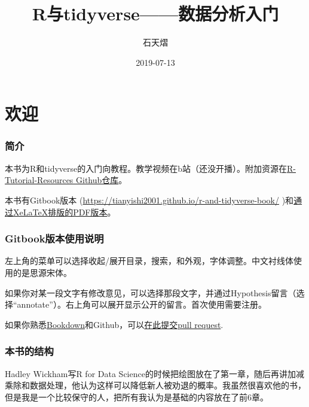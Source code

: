 \documentclass[]{book}
\title{R与tidyverse------数据分析入门}
\author{石天熠}
\date{2019-07-13}
\begin{document}
\maketitle

{
\setcounter{tocdepth}{1}
\tableofcontents
}
\hypertarget{welcome}{%
\chapter*{欢迎}\label{welcome}}

\hypertarget{intro}{%
\subsection*{简介}\label{intro}}

本书为R和tidyverse的入门向教程。教学视频在b站（还没开播）。附加资源在\href{https://github.com/TianyiShi2001/R-Tutorial-Resorces}{R-Tutorial-Resources Github仓库}。

本书有Gitbook版本 (\url{https://tianyishi2001.github.io/r-and-tidyverse-book/} )和\href{https://tianyishi2001.github.io/r-and-tidyverse-book/R与tidyverse——数据分析入门.pdf}{通过XeLaTeX排版的PDF版本}。

\hypertarget{man}{%
\subsection*{Gitbook版本使用说明}\label{man}}

左上角的菜单可以选择收起/展开目录，搜索，和外观，字体调整。中文衬线体使用的是思源宋体。

如果你对某一段文字有修改意见，可以选择那段文字，并通过Hypothesis留言（选择``annotate''）。右上角可以展开显示公开的留言。首次使用需要注册。

如果你熟悉\href{https://bookdown.org}{Bookdown}和Github，可以\href{https://github.com/TianyiShi2001/r-and-tidyverse-book}{在此提交pull request}.

\hypertarget{structure}{%
\subsection*{本书的结构}\label{structure}}

Hadley Wickham写R for Data Science的时候把绘图放在了第一章，随后再讲加减乘除和数据处理，他认为这样可以降低新人被劝退的概率。我虽然很喜欢他的书，但是我是一个比较保守的人，把所有我认为是基础的内容放在了前6章。
\end{document}
